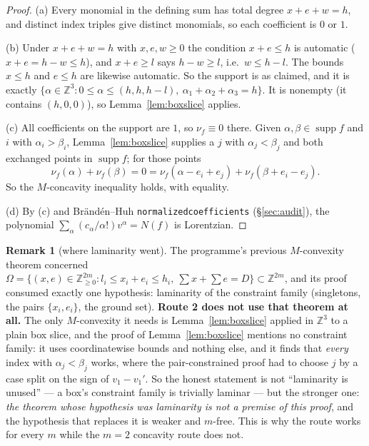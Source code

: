 \documentclass[11pt]{article}
\theoremstyle{plain}
\theoremstyle{definition}
\newtheorem{remark}[theorem]{Remark}
\DeclareMathOperator{\supp}{supp}
\newcommand{\Z}{\mathbb{Z}}
\begin{document}
\begin{proof}
(a) Every monomial in the defining sum has total degree $x+e+w=h$, and distinct index
triples give distinct monomials, so each coefficient is $0$ or $1$.

(b) Under $x+e+w=h$ with $x,e,w\ge0$ the condition $x+e\le h$ is automatic
($x+e=h-w\le h$), and $x+e\ge l$ says $h-w\ge l$, i.e.\ $w\le h-l$. The bounds $x\le h$ and
$e\le h$ are likewise automatic. So the support is as claimed, and it is exactly
$\{\alpha\in\Z^3:0\le\alpha\le(h,h,h-l),\ \alpha_1+\alpha_2+\alpha_3=h\}$. It is nonempty
(it contains $(h,0,0)$), so Lemma~\ref{lem:boxslice} applies.

(c) All coefficients on the support are $1$, so $\nu_f\equiv0$ there. Given
$\alpha,\beta\in\supp f$ and $i$ with $\alpha_i>\beta_i$, Lemma~\ref{lem:boxslice} supplies
a $j$ with $\alpha_j<\beta_j$ and both exchanged points in $\supp f$; for those points
\[
  \nu_f(\alpha)+\nu_f(\beta)=0=\nu_f(\alpha-e_i+e_j)+\nu_f(\beta+e_i-e_j).
\]
So the $M$-concavity inequality holds, with equality.

(d) By (c) and Brändén--Huh \texttt{normalizedcoefficients} (\S\ref{sec:audit}), the
polynomial $\sum_\alpha(c_\alpha/\alpha!)v^\alpha=N(f)$ is Lorentzian.
\end{proof}

\begin{remark}[where laminarity went]\label{rem:laminar}
The programme's previous $M$-convexity theorem concerned
$\Omega=\{(x,e)\in\Z_{\ge0}^{2m}:l_i\le x_i+e_i\le h_i,\ \sum x+\sum e=D\}\subset\Z^{2m}$,
and its proof consumed exactly one hypothesis: laminarity of the constraint family
(singletons, the pairs $\{x_i,e_i\}$, the ground set). \textbf{Route 2 does not use that
theorem at all.} The only $M$-convexity it needs is Lemma~\ref{lem:boxslice} applied in
$\Z^3$ to a plain box slice, and the proof of Lemma~\ref{lem:boxslice} mentions no
constraint family: it uses coordinatewise bounds and nothing else, and it finds that
\emph{every} index with $\alpha_j<\beta_j$ works, where the pair-constrained proof had to
choose $j$ by a case split on the sign of $v_1-v_1'$. So the honest statement is not
``laminarity is unused'' --- a box's constraint family is trivially laminar --- but the
stronger one: \emph{the theorem whose hypothesis was laminarity is not a premise of this
proof}, and the hypothesis that replaces it is weaker and $m$-free. This is why the route
works for every $m$ while the $m=2$ concavity route does not.
\end{remark}
\end{document}
